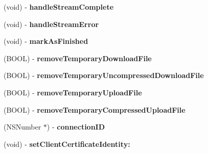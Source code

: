 \begin{DoxyCompactItemize}
\item 
\hypertarget{interface_a_s_i_h_t_t_p_request_aaf27f7d11cd1194d5087db56cc553d89}{
(void) -\/ {\bfseries handle\-Stream\-Complete}}
\label{interface_a_s_i_h_t_t_p_request_aaf27f7d11cd1194d5087db56cc553d89}

\item 
\hypertarget{interface_a_s_i_h_t_t_p_request_ab792c755bbcec55490688d2b5aa729ec}{
(void) -\/ {\bfseries handle\-Stream\-Error}}
\label{interface_a_s_i_h_t_t_p_request_ab792c755bbcec55490688d2b5aa729ec}

\item 
\hypertarget{interface_a_s_i_h_t_t_p_request_a0b812d27bc2a7ad7715e6d890923426e}{
(void) -\/ {\bfseries mark\-As\-Finished}}
\label{interface_a_s_i_h_t_t_p_request_a0b812d27bc2a7ad7715e6d890923426e}

\item 
\hypertarget{interface_a_s_i_h_t_t_p_request_a0e68fd4f22a1b5cdcfb3e63a3cdacde9}{
(\-B\-O\-O\-L) -\/ {\bfseries remove\-Temporary\-Download\-File}}
\label{interface_a_s_i_h_t_t_p_request_a0e68fd4f22a1b5cdcfb3e63a3cdacde9}

\item 
\hypertarget{interface_a_s_i_h_t_t_p_request_af8ef43877926d01b8a51abb62dd2e208}{
(\-B\-O\-O\-L) -\/ {\bfseries remove\-Temporary\-Uncompressed\-Download\-File}}
\label{interface_a_s_i_h_t_t_p_request_af8ef43877926d01b8a51abb62dd2e208}

\item 
\hypertarget{interface_a_s_i_h_t_t_p_request_aaf8e3adbbf00110b67232158921553c0}{
(\-B\-O\-O\-L) -\/ {\bfseries remove\-Temporary\-Upload\-File}}
\label{interface_a_s_i_h_t_t_p_request_aaf8e3adbbf00110b67232158921553c0}

\item 
\hypertarget{interface_a_s_i_h_t_t_p_request_a4f8b19d66be57ffad0d6128182c98414}{
(\-B\-O\-O\-L) -\/ {\bfseries remove\-Temporary\-Compressed\-Upload\-File}}
\label{interface_a_s_i_h_t_t_p_request_a4f8b19d66be57ffad0d6128182c98414}

\item 
\hypertarget{interface_a_s_i_h_t_t_p_request_a3e06c0a51784d32cc8198f616e63c530}{
(\-N\-S\-Number $\ast$) -\/ {\bfseries connection\-I\-D}}
\label{interface_a_s_i_h_t_t_p_request_a3e06c0a51784d32cc8198f616e63c530}

\item 
\hypertarget{interface_a_s_i_h_t_t_p_request_a4f24e48396e06b8a81de111e19c1314a}{
(void) -\/ {\bfseries set\-Client\-Certificate\-Identity\-:}}
\label{interface_a_s_i_h_t_t_p_request_a4f24e48396e06b8a81de111e19c1314a}


\end{DoxyCompactItemize}
